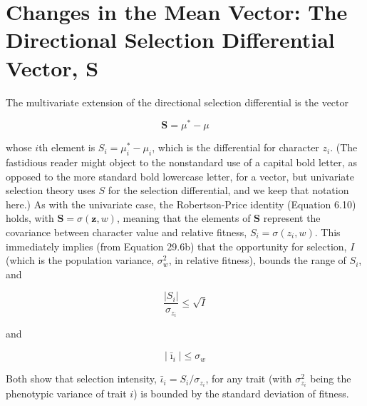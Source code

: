 \documentclass{article}
\begin{document}
\section{Changes in the Mean Vector: The Directional Selection Differential Vector, S}
The multivariate extension of the directional selection differential is the vector

\begin{equation}
\mathbf{S}=\mu^{*}-\mu
\end{equation}

whose $i$th element is $S_i = \mu_i^* - \mu_i$, which is the differential for character $z_i$. (The fastidious reader might object to the nonstandard use of a capital bold letter, as opposed to the more standard bold lowercase letter, for a vector, but univariate selection theory uses $S$ for the selection differential, and we keep that notation here.) As with the univariate case, the Robertson-Price identity (Equation 6.10) holds, with $\mathbf{S} = \sigma(\mathbf{z}, w)$, meaning that the elements of $\mathbf{S}$ represent the covariance between character value and relative fitness, $S_i = \sigma(z_i, w)$. This immediately implies (from Equation 29.6b) that the opportunity for selection, $I$ (which is the population variance, $\sigma_w^2$, in relative fitness), bounds the range of $S_i$, and

\begin{equation}
\frac{\left|S_{i}\right|}{\sigma_{z_{i}}}\leq\sqrt{I}
\tag{30.1a}
\label{eq:30_1a}
\end{equation}

and

\begin{equation}
\left|\bar{\imath}_{i}\right|\leq\sigma_{w}
\tag{30.1b}
\label{eq:30_1b}
\end{equation}

Both show that selection intensity,  $ \bar{\iota}_i = S_i / \sigma_{z_i} $, for any trait (with  $ \sigma_{z_i}^2 $ being the phenotypic variance of trait  $ i $) is bounded by the standard deviation of fitness.
\end{document}
